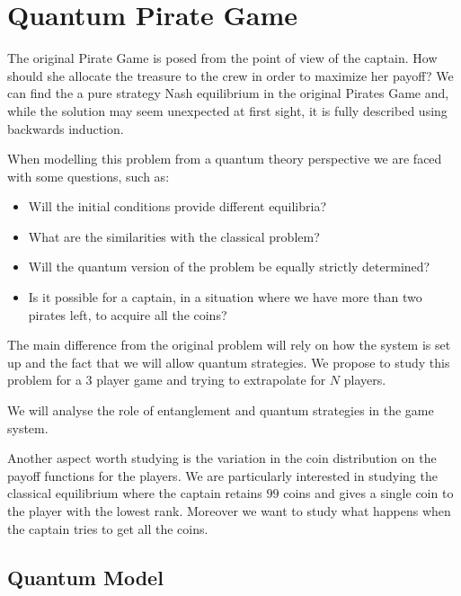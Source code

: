
\section{Quantum Pirate Game}
\label{sec:quantum_pirate}

The original Pirate Game is posed from the point of view of the captain. How should she allocate the treasure to the crew in order to maximize her payoff?
We can find the a pure strategy Nash equilibrium in the original Pirates Game and, while the solution may seem unexpected at first sight, it is fully described using backwards induction. 

When modelling this problem from a quantum theory perspective we are faced with some questions, such as:

\begin{itemize}
\item Will the initial conditions provide different equilibria? 

\item What are the similarities with the classical problem? 

\item Will the quantum version of the problem be equally strictly determined?

\item Is it possible for a captain, in a situation where we have more than two pirates left, to acquire all the coins?

\end{itemize} 

The main difference from the original problem will rely on how the system is set up and the fact that we will allow quantum strategies. 
We propose to study this problem for a $3$ player game and trying to extrapolate for $N$ players. 

We will analyse the role of entanglement and quantum strategies in the game system. 

Another aspect worth studying is the variation in the coin distribution on the payoff functions for the players. We are particularly interested in studying the classical equilibrium where the captain retains $99$ coins and gives a single coin to the player with the lowest rank. Moreover we want to study what happens when the captain tries to get all the coins.



\subsection{Quantum Model}
\label{subsec:description_2}

